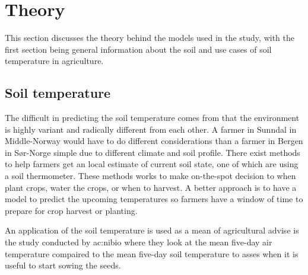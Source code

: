 \section{Theory}\label{sec:theory}

This section discusses the theory behind the models used in the study, with the first section being general information about the soil and use cases of soil temperature in agriculture.

\subsection{Soil temperature}

The difficult in predicting the soil temperature comes from that the environment is highly variant and radically different from each other. A farmer in Sunndal in Middle-Norway would have to do different considerations than a farmer in Bergen in Sør-Norge simple due to different climate and soil profile. There exist methods to help farmers get an local estimate of current soil state, one of which are using a soil thermometer. These methods works to make on-the-spot decision to when plant crops, water the crops, or when to harvest. A better approach is to have a model to predict the upcoming temperatures so farmers have a window of time to prepare for crop harvest or planting.

An application of the soil temperature is used as a mean of agricultural advise is the study conducted by \acrshort{ac:nibio} where they look at the mean five-day air temperature compaired to the mean five-day soil temperature to asses when it is useful to start sowing the seeds\cite{nordskog_jordtemperatur_2018}. 

